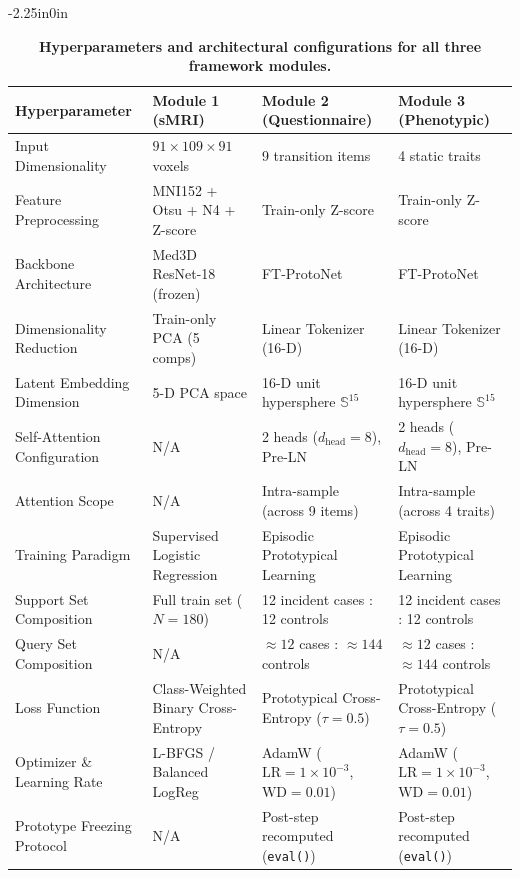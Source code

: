 \documentclass[10pt,letterpaper]{article}
\begin{document}
\begin{table}[!t]
\begin{adjustwidth}{-2.25in}{0in}
\centering
\caption{\textbf{Hyperparameters and architectural configurations for all three framework modules.}}
\label{tab:hyperparams}
\footnotesize
\renewcommand{\arraystretch}{1.15}
\begin{tabular}{|p{3.8cm}|p{3.5cm}|p{3.5cm}|p{3.5cm}|}
\hline
\textbf{Hyperparameter} & \textbf{Module 1 (sMRI)} & \textbf{Module 2 (Questionnaire)} & \textbf{Module 3 (Phenotypic)} \\
\hline
Input Dimensionality & $91 \times 109 \times 91$ voxels & 9 transition items & 4 static traits \\
\hline
Feature Preprocessing & MNI152 + Otsu + N4 + Z-score & Train-only Z-score & Train-only Z-score \\
\hline
Backbone Architecture & Med3D ResNet-18 (frozen) & FT-ProtoNet & FT-ProtoNet \\
\hline
Dimensionality Reduction & Train-only PCA (5 comps) & Linear Tokenizer (16-D) & Linear Tokenizer (16-D) \\
\hline
Latent Embedding Dimension & 5-D PCA space & 16-D unit hypersphere $\mathbb{S}^{15}$ & 16-D unit hypersphere $\mathbb{S}^{15}$ \\
\hline
Self-Attention Configuration & N/A & 2 heads ($d_{\text{head}} = 8$), Pre-LN & 2 heads ($d_{\text{head}} = 8$), Pre-LN \\
\hline
Attention Scope & N/A & Intra-sample (across 9 items) & Intra-sample (across 4 traits) \\
\hline
Training Paradigm & Supervised Logistic Regression & Episodic Prototypical Learning & Episodic Prototypical Learning \\
\hline
Support Set Composition & Full train set ($N=180$) & 12 incident cases : 12 controls & 12 incident cases : 12 controls \\
\hline
Query Set Composition & N/A & $\approx 12$ cases : $\approx 144$ controls & $\approx 12$ cases : $\approx 144$ controls \\
\hline
Loss Function & Class-Weighted Binary Cross-Entropy & Prototypical Cross-Entropy ($\tau=0.5$) & Prototypical Cross-Entropy ($\tau=0.5$) \\
\hline
Optimizer \& Learning Rate & L-BFGS / Balanced LogReg & AdamW ($\text{LR} = 1 \times 10^{-3}$, $\text{WD} = 0.01$) & AdamW ($\text{LR} = 1 \times 10^{-3}$, $\text{WD} = 0.01$) \\
\hline
Prototype Freezing Protocol & N/A & Post-step recomputed (\texttt{eval()}) & Post-step recomputed (\texttt{eval()}) \\

\end{tabular}
\end{adjustwidth}
\end{table}
\end{document}
